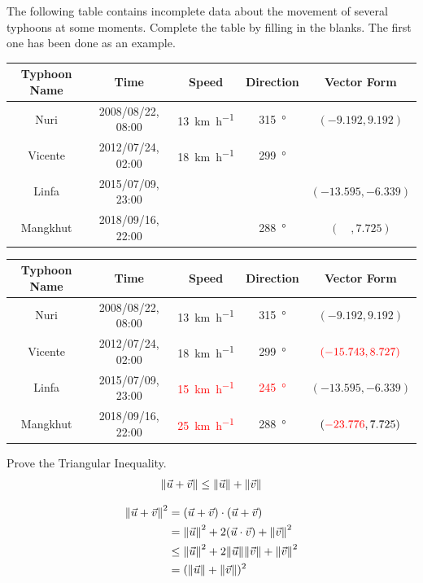\begin{Exercise}
The following table contains incomplete data about the movement of several typhoons at some moments. Complete the table by filling in the blanks. The first one has been done as an example.
\begin{center}
\footnotesize
\begin{tabular}{|c|c|c|c|c|}
\hline
Typhoon Name & Time & Speed & Direction & Vector Form\\
\hline
Nuri & 2008/08/22, 08:00 & \SI{13}{\km \per \hour} & \SI{315}{\degree} & $(-9.192, 9.192)$\\
\hline
Vicente & 2012/07/24, 02:00 & \SI{18}{\km \per \hour} & \SI{299}{\degree} & \\
\hline
Linfa & 2015/07/09, 23:00 & & & $(-13.595, -6.339)$\\
\hline
Mangkhut & 2018/09/16, 22:00 & & \SI{288}{\degree} & $(\quad, 7.725)$\\
\hline
\end{tabular}
\end{center}
\end{Exercise}
\begin{Answer}
\begin{center}
\footnotesize
\begin{tabular}{|c|c|c|c|c|}
\hline
Typhoon Name & Time & Speed & Direction & Vector Form\\
\hline
Nuri & 2008/08/22, 08:00 & \SI{13}{\km \per \hour} & \SI{315}{\degree} & $(-9.192, 9.192)$\\
\hline
Vicente & 2012/07/24, 02:00 & \SI{18}{\km \per \hour} & \SI{299}{\degree} & $\textcolor{red}{(-15.743, 8.727)}$\\
\hline
Linfa & 2015/07/09, 23:00 & \textcolor{red}{\SI{15}{\km \per \hour}} & \textcolor{red}{\SI{245}{\degree}} & $(-13.595, -6.339)$\\
\hline
Mangkhut & 2018/09/16, 22:00 & \textcolor{red}{\SI{25}{\km \per \hour}} & \SI{288}{\degree} & $(\textcolor{red}{-23.776}, 7.725)$\\
\hline
\end{tabular}
\end{center}    
\end{Answer}

\begin{Exercise}
\label{ex:triangular}
Prove the Triangular Inequality.
\begin{align*}
\norm{\vec{u} + \vec{v}} \leq \norm{\vec{u}} + \norm{\vec{v}}
\end{align*}
\end{Exercise}
\begin{Answer}
\begin{align*}
\norm{\vec{u} + \vec{v}}^2 &= (\vec{u} + \vec{v}) \cdot (\vec{u} + \vec{v}) \\
&= \norm{\vec{u}}^2 + 2(\vec{u}\cdot\vec{v}) + \norm{\vec{v}}^2 \\
&\leq \norm{\vec{u}}^2 + 2\norm{\vec{u}}\norm{\vec{v}} + \norm{\vec{v}}^2 \\
&= (\norm{\vec{u}} + \norm{\vec{v}})^2
\end{align*}
\end{Answer}

